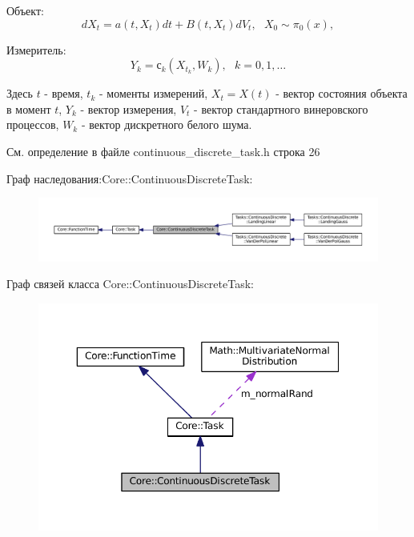\begin{DoxyItemize}
\item Объект\+: \[dX_t = a(t, X_t)dt + B(t, X_t)dV_t,\ \ \ X_0 \sim \pi_0(x),\]
\item Измеритель\+: \[Y_k = с_k(X_{t_k}, W_k),\ \ \ k = 0, 1, \ldots\]
\end{DoxyItemize}

Здесь $t$ -\/ время, $t_k$ -\/ моменты измерений, $X_t = X(t)$ -\/ вектор состояния объекта в момент $t$, $Y_k$ -\/ вектор измерения, $V_t$ -\/ вектор стандартного винеровского процессов, $W_k$ -\/ вектор дискретного белого шума. 

См. определение в файле continuous\+\_\+discrete\+\_\+task.\+h строка 26



Граф наследования\+:Core\+:\+:Continuous\+Discrete\+Task\+:
\nopagebreak
\begin{figure}[H]
\begin{center}
\leavevmode
\includegraphics[width=350pt]{class_core_1_1_continuous_discrete_task__inherit__graph}
\end{center}
\end{figure}


Граф связей класса Core\+:\+:Continuous\+Discrete\+Task\+:
\nopagebreak
\begin{figure}[H]
\begin{center}
\leavevmode
\includegraphics[width=350pt]{class_core_1_1_continuous_discrete_task__coll__graph}
\end{center}
\end{figure}


